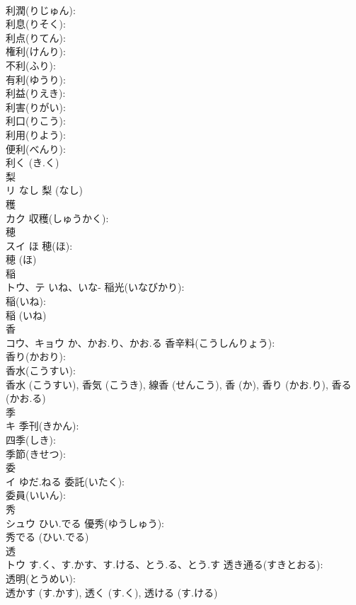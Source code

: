 \documentclass[8pt]{extreport}
\begin{document}
\begin{CJK}{UTF8}{min}
\\	利潤(りじゅん): 
\\	利息(りそく): 
\\	利点(りてん): 
\\	権利(けんり): 
\\	不利(ふり): 
\\	有利(ゆうり): 
\\	利益(りえき): 
\\	利害(りがい): 
\\	利口(りこう): 
\\	利用(りよう): 
\\	便利(べんり): 
\\	利く (き.く)
\\	梨			
\\	リ	なし		梨 (なし)
\\	穫			
\\	カク		収穫(しゅうかく): 
\\	穂			
\\	スイ	ほ	穂(ほ): 
\\	穂 (ほ)
\\	稲			
\\	トウ、テ	いね、いな-	稲光(いなびかり): 
\\	稲(いね): 
\\	稲 (いね)
\\	香			
\\	コウ、キョウ	か、かお.り、かお.る	香辛料(こうしんりょう): 
\\	香り(かおり): 
\\	香水(こうすい): 
\\	香水 (こうすい), 香気 (こうき), 線香 (せんこう), 香 (か), 香り (かお.り), 香る (かお.る)
\\	季			
\\	キ		季刊(きかん): 
\\	四季(しき): 
\\	季節(きせつ): 
\\	委			
\\	イ	ゆだ.ねる	委託(いたく): 
\\	委員(いいん): 
\\	秀			
\\	シュウ	ひい.でる	優秀(ゆうしゅう): 
\\	秀でる (ひい.でる)
\\	透			
\\	トウ	す.く、す.かす、す.ける、とう.る、とう.す	透き通る(すきとおる): 
\\	透明(とうめい): 
\\	透かす (す.かす), 透く (す.く), 透ける (す.ける)

\end{CJK}
\end{document}
